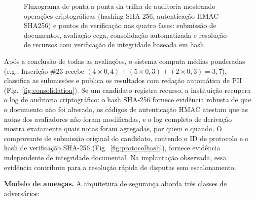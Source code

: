 \documentclass[preprint,12pt,a4paper]{elsarticle}
\begin{document}
\begin{figure}[H]
{%
}%
\caption{Fluxograma de ponta a ponta da trilha de auditoria mostrando operações criptográficas (hashing SHA-256, autenticação HMAC-SHA256) e pontos de verificação nas quatro fases: submissão de documentos, avaliação cega, consolidação automatizada e resolução de recursos com verificação de integridade baseada em hash.}
\label{fig:auditflow}
\end{figure}

Após a conclusão de todas as avaliações, o sistema computa médias ponderadas (e.g., Inscrição \#23 recebe $(4 \times 0{,}4) + (5 \times 0{,}3) + (2 \times 0{,}3) = 3{,}7$), classifica as submissões e publica os resultados com redação automática de PII (Fig.~\ref{fig:consolidation}). Se um candidato registra recurso, a instituição recupera o log de auditoria criptográfico: o hash SHA-256 fornece evidência robusta de que o documento não foi alterado, os códigos de autenticação HMAC atestam que as notas dos avaliadores não foram modificadas, e o log completo de derivação mostra exatamente quais notas foram agregadas, por quem e quando. O comprovante de submissão original do candidato, contendo o ID de protocolo e o hash de verificação SHA-256 (Fig.~\ref{fig:protocolhash}), fornece evidência independente de integridade documental. Na implantação observada, essa evidência contribuiu para a resolução rápida de disputas sem escalonamento.

\textbf{Modelo de ameaças.} A arquitetura de segurança aborda três classes de adversários:
\end{document}
